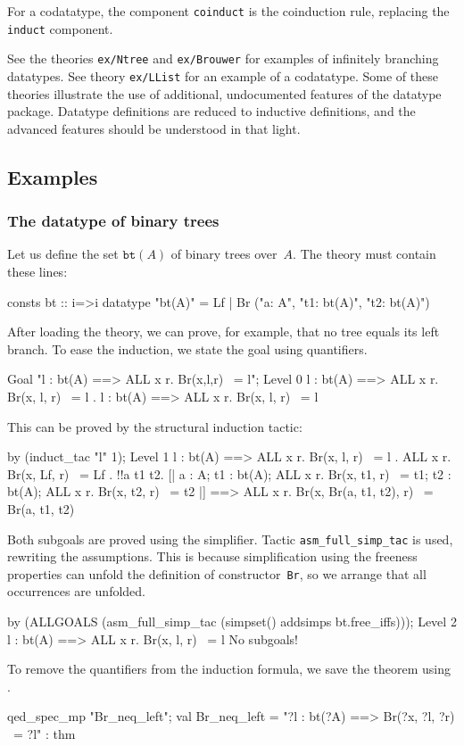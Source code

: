 For a codatatype, the component \texttt{coinduct} is the coinduction rule,
replacing the \texttt{induct} component.

See the theories \texttt{ex/Ntree} and \texttt{ex/Brouwer} for examples of
infinitely branching datatypes.  See theory \texttt{ex/LList} for an example
of a codatatype.  Some of these theories illustrate the use of additional,
undocumented features of the datatype package.  Datatype definitions are
reduced to inductive definitions, and the advanced features should be
understood in that light.


\subsection{Examples}

\subsubsection{The datatype of binary trees}

Let us define the set $\texttt{bt}(A)$ of binary trees over~$A$.  The theory
must contain these lines:
\begin{ttbox}
consts   bt :: i=>i
datatype "bt(A)"  =  Lf  |  Br ("a: A",  "t1: bt(A)",  "t2: bt(A)")
\end{ttbox}
After loading the theory, we can prove, for example, that no tree equals its
left branch.  To ease the induction, we state the goal using quantifiers.
\begin{ttbox}
Goal "l : bt(A) ==> ALL x r. Br(x,l,r) ~= l";
{\out Level 0}
{\out l : bt(A) ==> ALL x r. Br(x, l, r) ~= l}
{. l : bt(A) ==> ALL x r. Br(x, l, r) ~= l}
\end{ttbox}
This can be proved by the structural induction tactic:
\begin{ttbox}
by (induct_tac "l" 1);
{\out Level 1}
{\out l : bt(A) ==> ALL x r. Br(x, l, r) ~= l}
{. ALL x r. Br(x, Lf, r) ~= Lf}
{. !!a t1 t2.}
{\out        [| a : A; t1 : bt(A); ALL x r. Br(x, t1, r) ~= t1; t2 : bt(A);}
{\out           ALL x r. Br(x, t2, r) ~= t2 |]}
{\out        ==> ALL x r. Br(x, Br(a, t1, t2), r) ~= Br(a, t1, t2)}
\end{ttbox}
Both subgoals are proved using the simplifier.  Tactic
\texttt{asm_full_simp_tac} is used, rewriting the assumptions.
This is because simplification using the freeness properties can unfold the
definition of constructor~\texttt{Br}, so we arrange that all occurrences are
unfolded. 
\begin{ttbox}
by (ALLGOALS (asm_full_simp_tac (simpset() addsimps bt.free_iffs)));
{\out Level 2}
{\out l : bt(A) ==> ALL x r. Br(x, l, r) ~= l}
{\out No subgoals!}
\end{ttbox}
To remove the quantifiers from the induction formula, we save the theorem using
.
\begin{ttbox}
qed_spec_mp "Br_neq_left";
{\out val Br_neq_left = "?l : bt(?A) ==> Br(?x, ?l, ?r) ~= ?l" : thm}
\end{ttbox}

